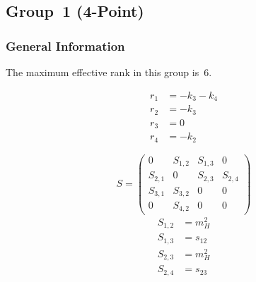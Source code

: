 \documentclass[a4paper]{article}
\begin{document}

\subsection{Group~1 (4-Point)}
\subsubsection*{General Information}
The maximum effective rank in this group is~6.

\begin{subequations}
\begin{align}
r_{1} &= -k_{3}-k_{4}\\
r_{2} &= -k_{3}\\
r_{3} &= 0\\
r_{4} &= -k_{2}
\end{align}
\end{subequations}

\begin{equation}
S=\left(\begin{array}{cccc}
   0&
   S_{1,2}&
   S_{1,3}&
   0\\
   S_{2,1}&
   0&
   S_{2,3}&
   S_{2,4}\\
   S_{3,1}&
   S_{3,2}&
   0&
   0\\
   0&
   S_{4,2}&
   0&
   0\end{array}\right)
\end{equation}
\begin{subequations}
\begin{align}
   S_{1,2}&=m_H^2\\
   S_{1,3}&=s_{12}\\
   S_{2,3}&=m_H^2\\
   S_{2,4}&=s_{23}
\end{align}
\end{subequations}
\end{document}
